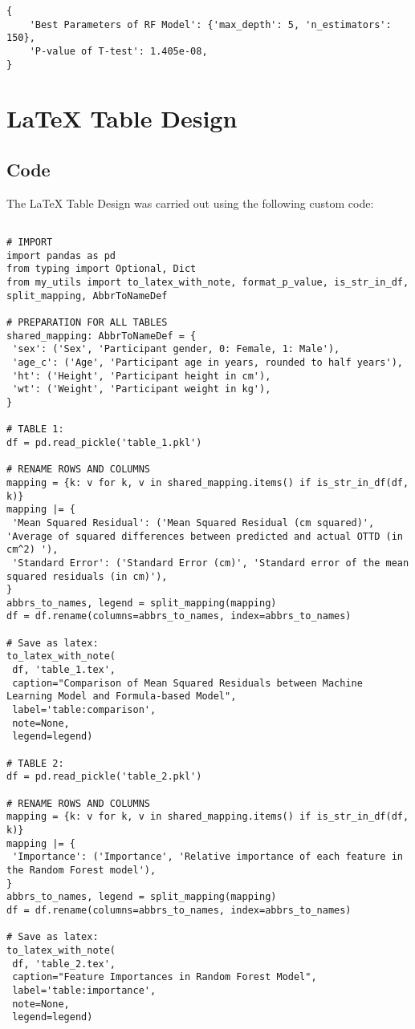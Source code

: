 \documentclass[11pt]{article}
\begin{document}
\begin{Verbatim}[tabsize=4]
{
    'Best Parameters of RF Model': {'max_depth': 5, 'n_estimators': 150},
    'P-value of T-test': 1.405e-08,
}
\end{Verbatim}

\section{LaTeX Table Design}
\subsection{{Code}}
The LaTeX Table Design was carried out using the following custom code:

\begin{verbatim}

# IMPORT
import pandas as pd
from typing import Optional, Dict
from my_utils import to_latex_with_note, format_p_value, is_str_in_df, split_mapping, AbbrToNameDef

# PREPARATION FOR ALL TABLES
shared_mapping: AbbrToNameDef = {
 'sex': ('Sex', 'Participant gender, 0: Female, 1: Male'),
 'age_c': ('Age', 'Participant age in years, rounded to half years'),
 'ht': ('Height', 'Participant height in cm'),
 'wt': ('Weight', 'Participant weight in kg'),
}

# TABLE 1:
df = pd.read_pickle('table_1.pkl')

# RENAME ROWS AND COLUMNS 
mapping = {k: v for k, v in shared_mapping.items() if is_str_in_df(df, k)} 
mapping |= {
 'Mean Squared Residual': ('Mean Squared Residual (cm squared)', 'Average of squared differences between predicted and actual OTTD (in cm^2) '),
 'Standard Error': ('Standard Error (cm)', 'Standard error of the mean squared residuals (in cm)'),
}
abbrs_to_names, legend = split_mapping(mapping)
df = df.rename(columns=abbrs_to_names, index=abbrs_to_names)

# Save as latex:
to_latex_with_note(
 df, 'table_1.tex',
 caption="Comparison of Mean Squared Residuals between Machine Learning Model and Formula-based Model", 
 label='table:comparison',
 note=None,
 legend=legend)

# TABLE 2:
df = pd.read_pickle('table_2.pkl')

# RENAME ROWS AND COLUMNS 
mapping = {k: v for k, v in shared_mapping.items() if is_str_in_df(df, k)} 
mapping |= {
 'Importance': ('Importance', 'Relative importance of each feature in the Random Forest model'),
}
abbrs_to_names, legend = split_mapping(mapping)
df = df.rename(columns=abbrs_to_names, index=abbrs_to_names)

# Save as latex:
to_latex_with_note(
 df, 'table_2.tex',
 caption="Feature Importances in Random Forest Model", 
 label='table:importance',
 note=None,
 legend=legend)
 

\end{verbatim}
\end{document}
